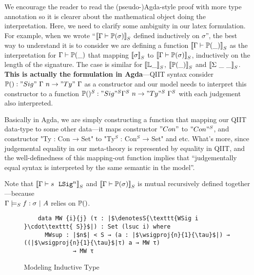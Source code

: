We encourage the reader to read the (pseudo-)Agda-style proof with more type annotation so it is clearer about the mathematical object doing the interpretation. Here, we need to clarify some ambiguity in our latex formulation. For example, when we wrote ``$\denotesS{\goodType{\Gm}{\TyTkg {\sigma}}{}}$ defined inductively on ${\sigma}$'', the best way to understand it is to consider we are defining a function $\denotesS{\goodType{\Gm}{\TyTkg {\_}}{}}$ as the interpretation for $\goodType{\Gm}{\TyTkg {\_}}{}$ that mapping $\denotesS{\sigma}$ to $\denotesS{\goodType{\Gm}{\TyTkg {\sigma}}{}}$, inductively on the length of the signature. The case is similar for $\denotesS{\cL \_}$, $\denotesS{\Tkg {\_}}$ and  $\denotesS{\Sigma \ \_ \ \_}$. \textbf{This is actually the formulation in Agda}---QIIT syntax consider $\TyTkg{} : "Sig"~\Gm~n \to "Ty"~\Gm$ as a constructor and our model needs to interpret this constructor to a function $\TyTkg{}^S : "Sig"^S \Gm^S~n \to "Ty"^S~\Gm^S$ with each judgement also interpreted. 

Basically in Agda, we are simply constructing a function that mapping our QIIT data-type to some other data---it maps constructor $"Con"$ to $"Con"^S$, and constructor "Ty : Con → Set" to "Ty$^S$ : Con$^S$ → Set" and etc. What's more, since judgemental equality in our meta-theory is represented by equality in QIIT, and the well-definedness of this mapping-out function implies that ``judgementally equal syntax is interpreted by the same semantic in the model''. 

Note that $\denotesS{\goodSig{\Gm}{s}{n}}$ and $\denotesS{\goodType{\Gm}{\TyTkg{\sigma}}{i}}$ is mutual recursively defined together---because \\ $\goodSealS{\Gm}{f}{\sigma}{A}$ relies on $\TyTkg{}$. 

\begin{figure}[!htb]
  \centering
\begin{minipage}{0.8\linewidth}
  \begin{verbatim}
    data MW {i}{j} (τ : |$\denotesS{\texttt{WSig i }\cdot\texttt{ S}}$|) : Set (lsuc i) where
      MWsup : |$n$| < S → (a : |$\wsigproj{n}{1}{\tau}$|) → ((|$\wsigproj{n}{1}{\tau}$|τ) a → MW τ) 
              → MW τ
      \end{verbatim}
\end{minipage}
\caption{Modeling Inductive Type}\label{fig:model-ind-type}
\end{figure}

